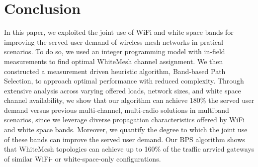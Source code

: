 \section{Conclusion}
\label{sec:conclusion}
In this paper, we exploited the joint use of WiFi and white space bands for 
improving the served user demand of wireless mesh networks in pratical scenarios.
To do so, we used an integer programming model with in-field measurements
 to find optimal WhiteMesh channel assignment. We then constructed a measurement 
 driven heuristic algorithm, Band-based Path Selection, to 
approach optimal performance with reduced complexity. Through 
extensive analysis across varying offered loads, network sizes, and white space 
channel availability, we show that our algorithm can achieve 180\% the served
user demand versus previous multi-channel, multi-radio solutions in multiband scenarios, 
since we leverage diverse propagation characteristics offered by WiFi and white space bands.  Moreover,
we quantify the degree to which the joint use of these bands can improve the served
user demand. Our BPS algorithm shows that WhiteMesh topologies can achieve up to 
160\% of the traffic arrvied gateways of similar WiFi- or white-space-only configurations.


